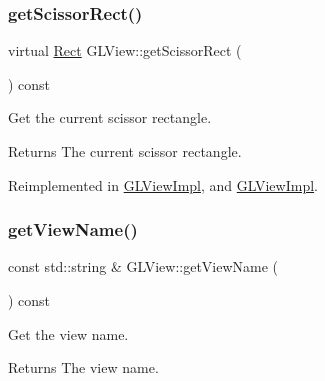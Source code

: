 \mbox{\label{classGLView_a3d3f1a186da65fd5787740f95f17dbbe}} 
\subsubsection{\texorpdfstring{get\+Scissor\+Rect()}{getScissorRect()}\hspace{0.1cm}{\footnotesize\ttfamily [2/2]}}
{\footnotesize\ttfamily virtual \hyperlink{classRect}{Rect} G\+L\+View\+::get\+Scissor\+Rect (\begin{DoxyParamCaption}{ }\end{DoxyParamCaption}) const\hspace{0.3cm}{\ttfamily [virtual]}}

Get the current scissor rectangle.

\begin{DoxyReturn}{Returns}
The current scissor rectangle. 
\end{DoxyReturn}


Reimplemented in \hyperlink{classGLViewImpl_ab6bbfe46964ec4797344ecaa4fff3b1d}{G\+L\+View\+Impl}, and \hyperlink{classGLViewImpl_ada58319111ad3cca8b03ed92cfbf1bdf}{G\+L\+View\+Impl}.

\mbox{\label{classGLView_a71162616a3fcb442b640c0ef9efe6a42}} 
\subsubsection{\texorpdfstring{get\+View\+Name()}{getViewName()}\hspace{0.1cm}{\footnotesize\ttfamily [1/2]}}
{\footnotesize\ttfamily const std\+::string \& G\+L\+View\+::get\+View\+Name (\begin{DoxyParamCaption}{ }\end{DoxyParamCaption}) const}

Get the view name.

\begin{DoxyReturn}{Returns}
The view name. 
\end{DoxyReturn}
\mbox{\label{classGLView_acfeda35caf23db9ae26fa07b5fc7dda1}} 
